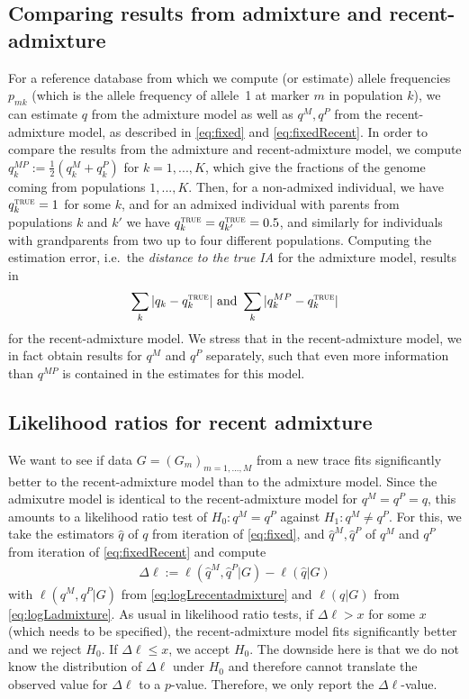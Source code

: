 \documentclass[12pt]{article}
\theoremstyle{definition}
\begin{document}
\subsection{Comparing results from admixture and recent-admixture}
For a reference database from which we compute (or estimate) allele
frequencies $p_{mk}$ (which is the allele frequency of allele~1 at
marker $m$ in population $k$), we can estimate $q$ from the admixture
model as well as $q^M,q^P$ from the recent-admixture model, as
described in \eqref{eq:fixed} and \eqref{eq:fixedRecent}. In order to
compare the results from the admixture and recent-admixture model, we
compute $q_k^{MP} := \tfrac 12 (q_k^M + q_k^P)$ for $k=1,...,K$, which
give the fractions of the genome coming from populations
$1,...,K$. Then, for a non-admixed individual, we have
$q_k^{\text{\sc true}} = 1$ for some $k$, and for an admixed
individual with parents from populations $k$ and $k'$ we have
$q_k^{\text{\sc true}} =q_{k'}^{\text{\sc true}} = 0.5$, and similarly
for individuals with grandparents from two up to four different
populations. Computing the estimation error, i.e.\ the {\em distance
  to the true IA} for the admixture model, results in
\begin{align}
  \label{eq:error}
  \sum_k |q_k - q_k^{\text{\sc true}}| \text{  and }\sum_k |q_k^{MP} - q_k^{\text{\sc true}}|
\end{align}
for the recent-admixture model. We stress that in the recent-admixture
model, we in fact obtain results for $q^M$ and $q^P$ separately, such
that even more information than $q^{MP}$ is contained in the estimates
for this model.

\subsection{Likelihood ratios for recent admixture}
We want to see if data $G = (G_m)_{m=1,...,M}$ from a new trace fits
significantly better to the recent-admixture model than to the
admixture model. Since the admixutre model is identical to the
recent-admixture model for $q^M = q^P = q$, this amounts to a
likelihood ratio test of $H_0: q^M = q^P$ against $H_1: q^M\neq
q^P$. For this, we take the estimators $\hat q$ of $q$ from iteration
of \eqref{eq:fixed}, and $\hat q^M, \hat q^P$ of $q^M$ and $q^P$ from
iteration of \eqref{eq:fixedRecent} and compute
\begin{align}
  \label{eq:DeltaEll}
  \Delta\ell := \ell(\hat q^M, \hat q^P|G) - \ell(\hat q|G)
\end{align}
with $\ell(q^M, q^P|G)$ from \eqref{eq:logLrecentadmixture} and
$\ell(q|G)$ from \eqref{eq:logLadmixture}. As usual
in likelihood ratio tests, if $\Delta \ell >x$ for some $x$ (which
needs to be specified), the recent-admixture model fits significantly
better and we reject $H_0$. If $\Delta \ell \leq x$, we accept $H_0$.
The downside here is that we do not know the distribution of
$\Delta\ell$ under $H_0$ and therefore cannot translate the observed
value for $\Delta\ell$ to a $p$-value. Therefore, we only report the
$\Delta\ell$-value.
\end{document}
